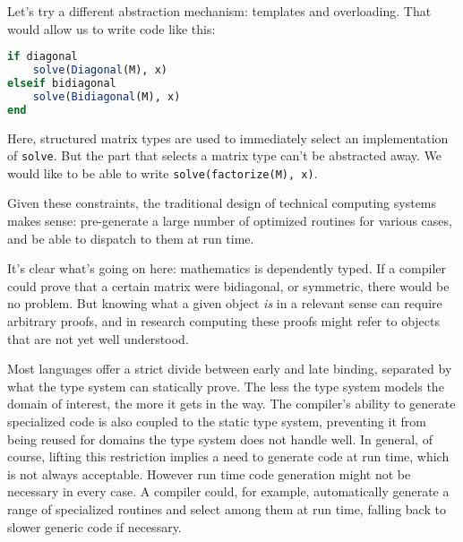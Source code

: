 Let's try a different abstraction mechanism: templates and overloading.
That would allow us to write code like this:

\begin{singlespace}
\begin{lstlisting}[language=julia]
if diagonal
    solve(Diagonal(M), x)
elseif bidiagonal
    solve(Bidiagonal(M), x)
end
\end{lstlisting}
\end{singlespace}

\noindent
Here, structured matrix types are used to immediately select an
implementation of \texttt{solve}.
But the part that selects a matrix type can't be abstracted away.
We would like to be able to write \texttt{solve(factorize(M), x)}.


Given these constraints, the traditional design of technical
computing systems makes sense: pre-generate a large number of
optimized routines for various cases, and be able to dispatch
to them at run time.

It's clear what's going on here: mathematics is dependently typed.
If a compiler could prove that a certain matrix were bidiagonal, or
symmetric, there would be no problem.
But knowing what a given object \emph{is} in a relevant sense can
require arbitrary proofs, and in research computing these proofs
might refer to objects that are not yet well understood.

Most languages offer a strict divide between early and late binding,
separated by what the type system can statically prove.
The less the type system models the domain of interest, the more it
gets in the way.
The compiler's ability to generate specialized code is also coupled
to the static type system, preventing it from being reused for domains
the type system does not handle well.
In general, of course, lifting this restriction implies a need to
generate code at run time, which is not always acceptable.
However run time code generation might not be necessary in every case.
A compiler could, for example, automatically generate a range of
specialized routines and select among them at run time, falling back
to slower generic code if necessary.

